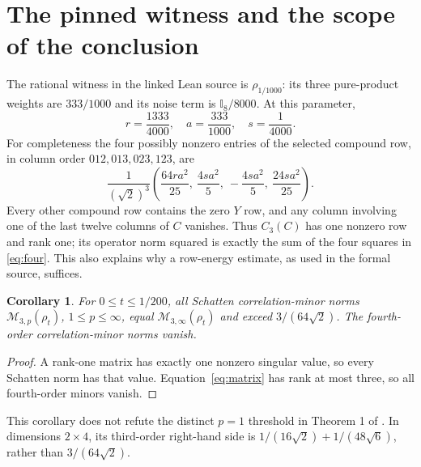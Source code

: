\documentclass[11pt]{article}
\newtheorem{corollary}[theorem]{Corollary}
\newcommand{\CM}{\mathcal M}
\newcommand{\Id}{\mathbb I}
\begin{document}
\section{The pinned witness and the scope of the conclusion}
The rational witness in the linked Lean source is $\rho_{1/1000}$:
its three pure-product weights are $333/1000$ and its noise term is
$\Id_8/8000$. At this parameter,
\[
 r=\frac{1333}{4000},\quad a=\frac{333}{1000},\quad
 s=\frac1{4000}.
\]
For completeness the four possibly nonzero entries of the selected
compound row, in column order $012,013,023,123$, are
\begin{equation}\label{eq:four}
 \frac1{(\sqrt2)^3}
 \left(\frac{64ra^2}{25},\ \frac{4sa^2}{5},\
       -\frac{4sa^2}{5},\ \frac{24sa^2}{25}\right).
\end{equation}
Every other compound row contains the zero $Y$ row, and any column
involving one of the last twelve columns of $C$ vanishes.
Thus $C_3(C)$ has one nonzero row and rank one; its operator norm
squared is exactly the sum of the four squares in \eqref{eq:four}.
This also explains why a row-energy estimate, as used in the formal
source, suffices.

\begin{corollary}
For $0\le t\le1/200$, all Schatten correlation-minor norms
$\CM_{3,p}(\rho_t)$, $1\le p\le\infty$, equal $\CM_{3,\infty}(\rho_t)$
and exceed $3/(64\sqrt2)$. The fourth-order correlation-minor norms vanish.
\end{corollary}
\begin{proof}
A rank-one matrix has exactly one nonzero singular value, so every
Schatten norm has that value. Equation~\eqref{eq:matrix} has rank at
most three, so all fourth-order minors vanish.
\end{proof}

This corollary does not refute the distinct $p=1$ threshold in
Theorem 1 of \cite{peled}. In dimensions $2\times4$, its third-order
right-hand side is $1/(16\sqrt2)+1/(48\sqrt6)$, rather than
$3/(64\sqrt2)$.
\end{document}
